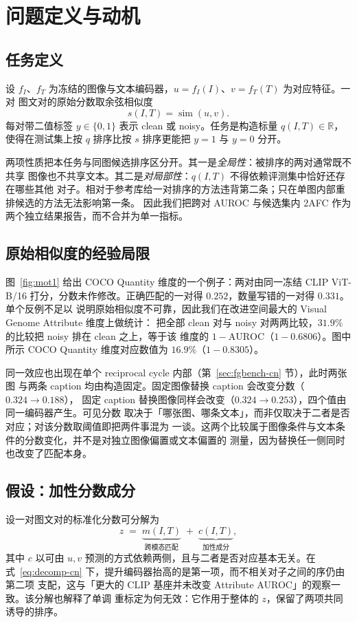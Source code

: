 \documentclass[10pt,twocolumn,a4paper]{ctexart}
\begin{document}
\section{问题定义与动机}
\label{sec:problem-cn}

\subsection{任务定义}
设 $f_I$、$f_T$ 为冻结的图像与文本编码器，$u=f_I(I)$、$v=f_T(T)$ 为对应特征。一对
图文对的原始分数取余弦相似度
\begin{equation}
  s(I,T)=\operatorname{sim}(u,v).
\end{equation}
每对带二值标签 $y\in\{0,1\}$ 表示 clean 或 noisy。任务是构造标量
$q(I,T)\in\mathbb{R}$，使得在测试集上按 $q$ 排序比按 $s$ 排序更能把 $y=1$ 与 $y=0$
分开。

两项性质把本任务与同图候选排序区分开。其一是\emph{全局性}：被排序的两对通常既不共享
图像也不共享文本。其二是\emph{对局部性}：$q(I,T)$ 不得依赖评测集中恰好还存在哪些其他
对子。相对于参考库给一对排序的方法违背第二条；只在单图内部重排候选的方法无法影响第一条。
因此我们把跨对 AUROC 与候选集内 2AFC 作为两个独立结果报告，而不合并为单一指标。

\subsection{原始相似度的经验局限}
图~\ref{fig:mot1} 给出 COCO Quantity 维度的一个例子：两对由同一冻结 CLIP ViT-B/16
打分，分数未作修改。正确匹配的一对得 $0.252$，数量写错的一对得 $0.331$。单个反例不足以
说明原始相似度不可靠，因此我们在改进空间最大的 Visual Genome Attribute 维度上做统计：
把全部 clean 对与 noisy 对两两比较，$31.9\%$ 的比较把 noisy 排在 clean 之上，等于该
维度的 $1-\mathrm{AUROC}$（$1-0.6806$）。图中所示 COCO Quantity 维度对应数值为
$16.9\%$（$1-0.8305$）。

同一效应也出现在单个 reciprocal cycle 内部（第~\ref{sec:fgbench-cn} 节），此时两张图
与两条 caption 均由构造固定。固定图像替换 caption 会改变分数（$0.324\to0.188$），
固定 caption 替换图像同样会改变（$0.324\to0.253$），四个值由同一编码器产生。可见分数
取决于「哪张图、哪条文本」，而非仅取决于二者是否对应；对该分数取阈值即把两件事混为
一谈。这两个比较属于图像条件与文本条件的分数变化，并不是对独立图像偏置或文本偏置的
测量，因为替换任一侧同时也改变了匹配本身。

\subsection{假设：加性分数成分}
设一对图文对的标准化分数可分解为
\begin{equation}
  z \;=\; \underbrace{m(I,T)}_{\text{跨模态匹配}} \;+\;
         \underbrace{c(I,T)}_{\text{加性成分}},
  \label{eq:decomp-cn}
\end{equation}
其中 $c$ 以可由 $u,v$ 预测的方式依赖两侧，且与二者是否对应基本无关。在
式~\eqref{eq:decomp-cn} 下，提升编码器抬高的是第一项，而不相关对子之间的序仍由第二项
支配，这与「更大的 CLIP 基座并未改变 Attribute AUROC」的观察一致。该分解也解释了单调
重标定为何无效：它作用于整体的 $z$，保留了两项共同诱导的排序。
\end{document}
